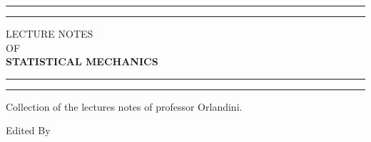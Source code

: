 \begin{titlepage} %

	\centering %
	
	\scshape %
	
	\vspace*{\baselineskip} %
	
	
	\rule{\textwidth}{1.6pt}\vspace*{-\baselineskip}\vspace*{2pt} %
	\rule{\textwidth}{0.4pt} %
	
	\vspace{0.75\baselineskip} %
	
	{\large LECTURE NOTES\\ OF\\ \LARGE \textbf{STATISTICAL MECHANICS}\\} %
	
	\vspace{0.75\baselineskip} %
	
	\rule{\textwidth}{0.4pt}\vspace*{-\baselineskip}\vspace{3.2pt} %
	\rule{\textwidth}{1.6pt} %
	
	\vspace{2\baselineskip} %
	
	
	Collection of the lectures notes of professor Orlandini. %
	
	\vspace*{3\baselineskip} %
	
	
	Edited By
	
	\vspace{0.5\baselineskip} %
	

\end{titlepage}
